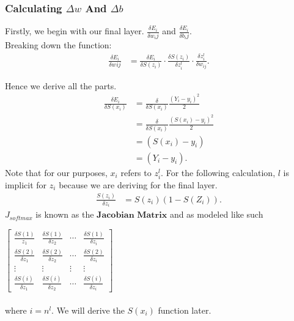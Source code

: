 \documentclass[11pt,letterpaper]{amsbook}
\theoremstyle{definition}
\numberwithin{definition}{chapter}
\numberwithin{exercise}{chapter}
\numberwithin{section}{chapter}
\newcommand{\ds}{\displaystyle}
\begin{document}
\subsubsection{Calculating $\Delta w$ And $\Delta b$}
Firstly, we begin with our final layer.  $\ds \frac{\delta E_i}{\delta w_ij}$ and $\ds \frac{\delta E_i}{\delta b_ij}$.  \\
Breaking down the function: 
\begin{align}
    \frac{\delta E_i}{\delta w_{}ij} &= \frac{\delta E_i}{\delta S(z_i)} \cdot \frac{\delta S(z_i)}{\delta z^l_i} \cdot \frac{\delta z^l_i}{\delta w_{ij}}.
\end{align}

Hence we derive all the parts.
\begin{align}
    \frac{\delta E_i}{\delta S(x_i)} &= \frac{\delta}{\delta S(x_i)} \frac{(Y_i - y_i)^2}{2} \\ &= \frac{\delta}{\delta S(x_i)} \frac{(S(x_i) - y_i)^2}{2} \\ &= (S(x_i) - y_i) \\ &= (Y_i - y_i).
\end{align}
Note that for our purposes, $x_i$ refers to $z^l_i$. For the following calculation, $l$ is implicit for $z_i$ because we are deriving for the final layer.
\begin{align}
    \frac{S(z_i)}{\delta z_i} &= S(z_i) (1 - S(Z_i)).
\end{align}
$\ds J_{softmax}$ is known as the $\textbf{Jacobian Matrix}$ and as modeled like such 
\vspace{1em}

$\begin{bmatrix}
    \frac{\delta S(1)}{z_1} & \frac{\delta S(1)}{\delta z_2} & \cdots & \frac{\delta S(1)}{\delta z_{i}} \\ \frac{\delta S(2)}{\delta z_1} & \frac{\delta S(2)}{\delta z_2} & \cdots & \frac{\delta S(2)}{\delta z_{i}} \\ \vdots & \vdots & \vdots & \vdots \\ \frac{\delta S(i)}{\delta z_1} & \frac{\delta S(i)}{\delta z_2} & \cdots & \frac{\delta S(i)}{\delta z_{i}}
\end{bmatrix}$
\\\\where $\ds i = n^l$. We will derive the $S(x_i)$ function later.
\end{document}
